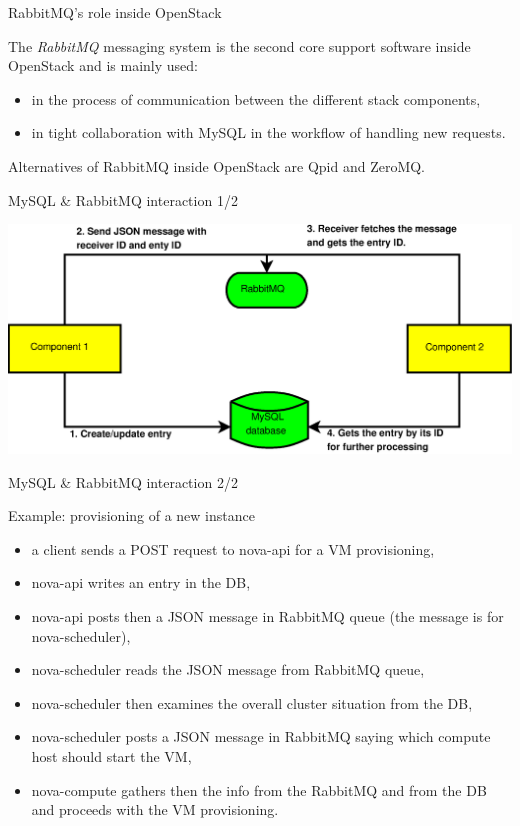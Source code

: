 \documentclass[english,serif,mathserif]{beamer}
\begin{document}
\begin{frame}{RabbitMQ's role inside OpenStack}

The \textit{RabbitMQ} messaging system is the second core
support software inside OpenStack and is mainly used:

\begin{itemize}
\item in the process of communication between the different stack components, 
\item in tight collaboration with MySQL in the workflow of handling new requests.
\end{itemize} 

Alternatives of RabbitMQ inside OpenStack are Qpid and ZeroMQ.

\end{frame}
\begin{frame}{MySQL \& RabbitMQ interaction 1/2}

\includegraphics[scale=0.37]{db-rabbitmq.eps}

\end{frame}
\begin{frame}{MySQL \& RabbitMQ interaction 2/2}

Example: provisioning of a new instance

\begin{itemize}
\item a client sends a POST request to nova-api for a VM provisioning,
\item nova-api writes an entry in the DB,
\item nova-api posts then a JSON message in RabbitMQ queue (the message is for nova-scheduler),
\item nova-scheduler reads the JSON message from RabbitMQ queue,
\item nova-scheduler then examines the overall cluster situation from the DB,
\item nova-scheduler posts a JSON message in RabbitMQ saying which compute host should start the VM,
\item nova-compute gathers then the info from the RabbitMQ and from the DB and proceeds with the VM provisioning.
\end{itemize}

\end{frame}
\end{document}
